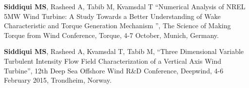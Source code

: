 \begin{cventries}
{\begin{cvitems}
			\item {\textbf{Siddiqui MS}, Rasheed A, Tabib M, Kvamsdal T “Numerical Analysis of NREL 5MW Wind Turbine: A Study Towards a Better Understanding of Wake Characteristic and Torque Generation Mechanism ”, The Science of Making Torque from Wind Conference, Torque, 4-7 October, Munich, Germany.}            
			\item {\textbf{Siddiqui MS}, Rasheed A,  Kvamsdal T, Tabib M, “Three Dimensional Variable Turbulent Intensity Flow Field Characterization of a Vertical Axis Wind Turbine”, 12th Deep Sea Offshore Wind R\&D Conference, Deepwind, 4-6 February 2015, Trondheim, Norway.}                
		\end{cvitems}
	}
\end{cventries}
